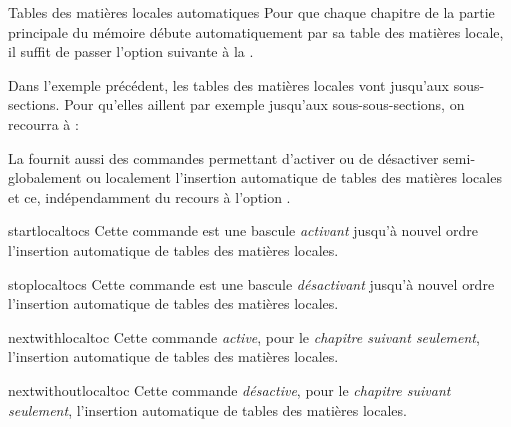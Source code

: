 \begin{dbexample}{Tables des matières locales automatiques}{}
  Pour que chaque chapitre de la partie principale du mémoire débute
  automatiquement par sa table des matières locale, il suffit de passer l'option
  suivante à la \yatCl{}.

  Dans l'exemple précédent, les tables des matières locales vont jusqu'aux
  sous-sections. Pour qu'elles aillent par exemple jusqu'aux sous-sous-sections,
  on recourra à :
\end{dbexample}

La \yatCl{} fournit aussi des commandes permettant d'activer ou de désactiver
semi-globalement ou localement l'insertion automatique de tables des matières
locales et ce, indépendamment du recours à l'option .

\begin{docCommand}[doc new=2016-10-30]{startlocaltocs}{}
  Cette commande est une bascule \emph{activant} jusqu'à nouvel ordre
  l'insertion automatique de tables des matières locales.
\end{docCommand}

\begin{docCommand}[doc new=2016-10-30]{stoplocaltocs}{}
  Cette commande est une bascule \emph{désactivant} jusqu'à nouvel ordre
  l'insertion automatique de tables des matières locales.
\end{docCommand}

\begin{docCommand}[doc new=2016-10-30]{nextwithlocaltoc}{}
  Cette commande \emph{active}, pour le \emph{chapitre suivant seulement},
  l'insertion automatique de tables des matières locales.
\end{docCommand}

\begin{docCommand}[doc new=2016-10-30]{nextwithoutlocaltoc}{}
  Cette commande \emph{désactive}, pour le \emph{chapitre suivant seulement},
  l'insertion automatique de tables des matières locales.
\end{docCommand}

